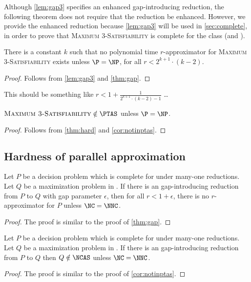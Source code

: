 \documentclass[]{article}
\begin{document}
Although \autoref{lem:gap3} specifies an enhanced gap-introducing reduction, the following theorem does not require that the reduction be enhanced.
However, we provide the enhanced reduction because \autoref{lem:gap3} will be used in \autoref{sec:complete}, in order to prove that \textsc{Maximum 3-Satisfiability} is complete for the class \APX{} (and \NCX).

\begin{theorem}\label{thm:hard}
  There is a constant $k$ such that no polynomial time $r$-approximator for \textsc{Maximum 3-Satisfiability} exists unless $\P = \NP$, for all $r < 2^{k + 1} \cdot (k - 2)$.
\end{theorem}
\begin{proof}
  Follows from \autoref{lem:gap3} and \autoref{thm:gap}.
\end{proof}

\begin{todo}
  This should be something like $r < 1 + \frac{1}{2^{k + 1} \cdot (k - 2) - 1}$ \ldots
\end{todo}

\begin{corollary}\label{cor:satnotinptas}
  $\textsc{Maximum 3-Satisfiability} \notin \PTAS$ unless $\P = \NP$.
\end{corollary}
\begin{proof}
  Follows from \autoref{thm:hard} and \autoref{cor:notinptas}.
\end{proof}

\subsection{Hardness of parallel approximation}\label{ssc:nchardness}

\begin{theorem}\label{thm:ncgap}
  Let $P$ be a decision problem which is complete for \NNC{} under \NC{} many-one reductions.
  Let $Q$ be a maximization problem in \NNCO.
  If there is an \NC{} gap-introducing reduction from $P$ to $Q$ with gap parameter $\epsilon$, then for all $r < 1 + \epsilon$, there is no \FNC{} $r$-approximator for $P$ unless $\NC = \NNC$.
\end{theorem}
\begin{proof}
  The proof is similar to the proof of \autoref{thm:gap}.
\end{proof}

\begin{corollary}\label{cor:notinncas}
  Let $P$ be a decision problem which is complete for \NNC{} under \NC{} many-one reductions.
  Let $Q$ be a maximization problem in \NNCO.
  If there is an \NC{} gap-introducing reduction from $P$ to $Q$ then $Q \notin \NCAS$ unless $\NC = \NNC$.
\end{corollary}
\begin{proof}
  The proof is similar to the proof of \autoref{cor:notinptas}.
\end{proof}
\end{document}
